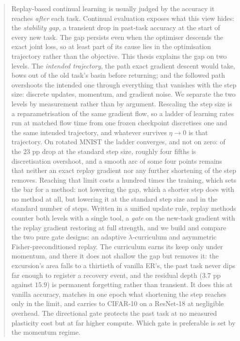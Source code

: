 \begin{abstract}
    \noindent
    Replay-based continual learning is usually judged by the accuracy it reaches \emph{after} each task. Continual evaluation exposes what this view hides: the \emph{stability gap}, a transient drop in past-task accuracy at the start of every new task. The gap persists even when the optimiser descends the exact joint loss, so at least part of its cause lies in the optimisation trajectory rather than the objective. This thesis explains the gap on two levels. The \emph{intended trajectory}, the path exact gradient descent would take, bows out of the old task's basin before returning; and the followed path overshoots the intended one through everything that vanishes with the step size: discrete updates, momentum, and gradient noise. We separate the two levels by measurement rather than by argument. Rescaling the step size is a reparametrisation of the same gradient flow, so a ladder of learning rates run at matched flow time from one frozen checkpoint discretises one and the same intended trajectory, and whatever survives $\eta \rightarrow 0$ is that trajectory. On rotated MNIST the ladder converges, and not on zero: of the $23$ pp drop at the standard step size, roughly four fifths is discretisation overshoot, and a smooth arc of some four points remains that neither an exact replay gradient nor any further shortening of the step removes. Reaching that limit costs a hundred times the training, which sets the bar for a method: not lowering the gap, which a shorter step does with no method at all, but lowering it at the standard step size and in the standard number of steps. Written in a unified update rule, replay methods counter both levels with a single tool, a \emph{gate} on the new-task gradient with the replay gradient restoring at full strength, and we build and compare the two pure gate designs: an adaptive $\lambda$-curriculum and asymmetric Fisher-preconditioned replay. The curriculum earns its keep only under momentum, and there it does not shallow the gap but removes it: the excursion's area falls to a thirtieth of vanilla ER's, the past task never dips far enough to register a recovery event, and the residual depth ($3.7$ pp against $15.9$) is permanent forgetting rather than transient. It does this at vanilla accuracy, matches in one epoch what shortening the step reaches only in the limit, and carries to CIFAR-10 on a ResNet-18 at negligible overhead. The directional gate protects the past task at no measured plasticity cost but at far higher compute. Which gate is preferable is set by the momentum regime.
\end{abstract}
